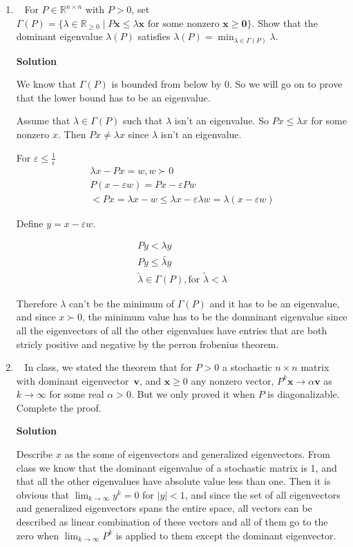 \documentclass[11pt]{article}
\newcommand\score[1]{\marginpar{\vspace{-2ex}\color{blue}{#1/3}}\hspace{-1ex}}
\newcommand\0{\mathbf{0}}
\newcommand\RR{\mathbb{R}}
\newcommand\vv{\mathbf{v}}
\newcommand\xx{\mathbf{x}}
\newcommand\<{\langle}
\renewcommand\>{\rangle}
\begin{document}
\begin{enumerate}
\item\ \score{}%
For $P \in \RR^{n \times n}$ with $P > 0$, set $\Gamma(P) = \{\lambda
\in \RR_{\geq 0} \mid P\xx \leq \lambda\xx \text{ for some nonzero }
\xx \geq \0\}$.  Show that the dominant eigenvalue $\lambda(P)$
satisfies $\lambda(P) = \min_{\lambda\in\Gamma(P)} \lambda$.


\textbf{Solution}

We know that $\Gamma(P)$ is bounded from below by 0. 
So we will go on to prove that the lower bound has to be an eigenvalue. 

Assume that $\lambda \in \Gamma(P)$ such that $\lambda$ isn't an eigenvalue.
So $Px\leq \lambda x$ for some nonzero $x$. Then $Px\neq \lambda x$ since $\lambda$ isn't an eigenvalue.

For $\varepsilon \leq \frac{1}{\epsilon}$
\begin{align*}
  \lambda x- Px = w, w\succ 0\\
  P(x - \varepsilon w) = Px-\varepsilon P w \\
  <  Px = \lambda x - w \leq \lambda x - \varepsilon \lambda w = \lambda (x- \varepsilon w)
\end{align*}

Define $y=x-\varepsilon w$.

\begin{align*}
Py < \lambda y\\
Py\leq \tilde{\lambda y}\\
\tilde{\lambda } \in \Gamma(P), \text{for } \tilde{\lambda} < \lambda
\end{align*}

Therefore $\lambda$ can't be the minimum of $\Gamma(P)$ and it has to be an eigenvalue, and since $x \succ 0$, the minimum value 
has to be the domninant eigenvalue since all the eigenvectors of all the other eigenvalues have entries that are both stricly positive and negative 
by the perron frobenius theorem.
\item\ \score{}%
In class, we stated the theorem that for $P > 0$ a stochastic $n
\times n$ matrix with dominant eigenvector~$\vv$, and $\xx \geq 0$ any
nonzero vector, $P^k\xx \to \alpha\vv$ as $k\to\infty$ for some real
$\alpha > 0$.  But we only proved it when $P$ is diagonalizable.
Complete the proof.

\textbf{Solution}

Describe $x$ as the some of eigenvectors and generalized eigenvectors. From 
class we know that the dominant eigenvalue of a stochastic matrix is 1, and that 
all the other eigenvalues have absolute value less than one. Then it is obvious that 
$\lim_{k\rightarrow \infty} y^{k}=0$ for $|y|<1$, and since the set of all eigenvectors 
and generalized eigenvectors spans the entire space, all vectors can be described as 
linear combination of these vectors and all of them go to the zero when $\lim_{k\rightarrow \infty}P^{k}$ is applied to 
them except the dominant eigenvector.


\end{enumerate}
\end{document}

